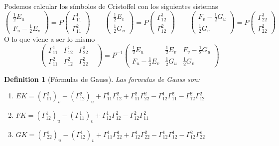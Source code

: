 \documentclass[leqno]{article}
\newtheorem*{definition}{Definition}
\begin{document}
Podemos calcular los símbolos de Cristoffel con los siguientes sistemas
\[
  \begin{pmatrix} \frac{1}{2}E_u \\ F_u-\frac{1}{2}E_v \end{pmatrix}  = P\begin{pmatrix} \Gamma_{11}^1 \\ \Gamma_{11}^2 \end{pmatrix}  \qquad
  \begin{pmatrix} \frac{1}{2}E_v \\ \frac{1}{2}G_u \end{pmatrix}  = P\begin{pmatrix} \Gamma_{12}^1 \\ \Gamma_{12}^2 \end{pmatrix} \qquad 
  \begin{pmatrix} F_v-\frac{1}{2}G_u \\ \frac{1}{2}G_v \end{pmatrix}  = P\begin{pmatrix} \Gamma_{22}^1 \\ \Gamma_{22}^2 \end{pmatrix} 
\] 
O lo que viene a ser lo mismo
\[
  \begin{pmatrix} \Gamma_{11}^1 & \Gamma_{12}^1 & \Gamma_{22}^1 \\ \Gamma_{11}^2 & \Gamma_{12}^2 & \Gamma_{22}^2 &  \end{pmatrix}  = P^{-1} \begin{pmatrix} \frac{1}{2}E_u & \frac{1}{2}E_v & F_v - \frac{1}{2}G_u \\ F_u - \frac{1}{2}E_v & \frac{1}{2}G_u & \frac{1}{2}G_v \end{pmatrix} 
\] 

\begin{definition}[Fórmulas de Gauss] Las formulas de Gauss son:
  \begin{enumerate}[topsep=-6pt, itemsep=0pt]
    \item $EK = (\Gamma_{11}^2)_v - (\Gamma_{12}^2)_u + \Gamma_{11}^1\Gamma_{12}^2 + \Gamma_{11}^2\Gamma_{22}^2 - \Gamma_{12}^1\Gamma_{11}^2 - \Gamma_{12}^2\Gamma_{12}^2$
    \item $FK = (\Gamma_{12}^1)_u - (\Gamma_{11}^1)_v + \Gamma_{12}^1\Gamma_{12}^2 - \Gamma_{12}^2\Gamma_{11}^2$
    \item $GK = (\Gamma_{22}^1)_u - (\Gamma_{12}^1)_v + \Gamma_{11}^1\Gamma_{22}^1 + \Gamma_{12}^1\Gamma_{22}^2 - \Gamma_{12}^1\Gamma_{12}^1 - \Gamma_{12}^2\Gamma_{22}^1$
  \end{enumerate}
\end{definition}
\end{document}
